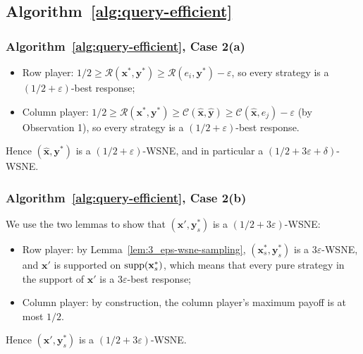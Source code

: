 \subsection{Algorithm~\ref{alg:query-efficient}}
\label{app:case-analysis-details-algo-2}

\subsubsection{Algorithm~\ref{alg:query-efficient}, Case 2(a)}
\label{app:case-two-low}

\begin{itemize}
  \item Row player: \(1/2 \ge \mathcal{R}(\mathbf{x}^*, \mathbf{y}^*) \ge \mathcal{R}(e_i, \mathbf{y}^*) - \varepsilon\), so every strategy is a \((1/2 + \varepsilon)\)-best response;
  \item Column player: \(1/2 \ge \mathcal{R}(\mathbf{x}^*, \mathbf{y}^*) \ge \mathcal{C}(\hat{\mathbf{x}}, \hat{\mathbf{y}}) \ge \mathcal{C}(\hat{\mathbf{x}}, e_j) - \varepsilon\) (by Observation 1), so every strategy is a \((1/2 + \varepsilon)\)-best response.
\end{itemize}

Hence \((\hat{\mathbf{x}}, \mathbf{y}^*)\) is a \((1/2 + \varepsilon)\)-WSNE, and in particular a \((1/2 + 3\varepsilon + \delta)\)-WSNE.

\subsubsection{Algorithm~\ref{alg:query-efficient}, Case 2(b)}
\label{app:case-two-low-high}

We use the two lemmas to show that \((\mathbf{x}', \mathbf{y}_s^*)\) is a \((1/2 + 3\varepsilon)\)-WSNE:

\begin{itemize}
  \item Row player: by Lemma~\ref{lem:3_eps-wsne-sampling}, \((\mathbf{x}_s^*, \mathbf{y}_s^*)\) is a \(3\varepsilon\)-WSNE, and \(\mathbf{x}'\) is supported on \(\operatorname{supp}(\mathbf{x}_s^*)\), which means that every pure strategy in the support of \(\mathbf{x}'\) is a \(3\varepsilon\)-best response;
  \item Column player: by construction, the column player's maximum payoff is at most \(1/2\).
\end{itemize}

Hence \((\mathbf{x}', \mathbf{y}_s^*)\) is a \((1/2 + 3\varepsilon)\)-WSNE.

